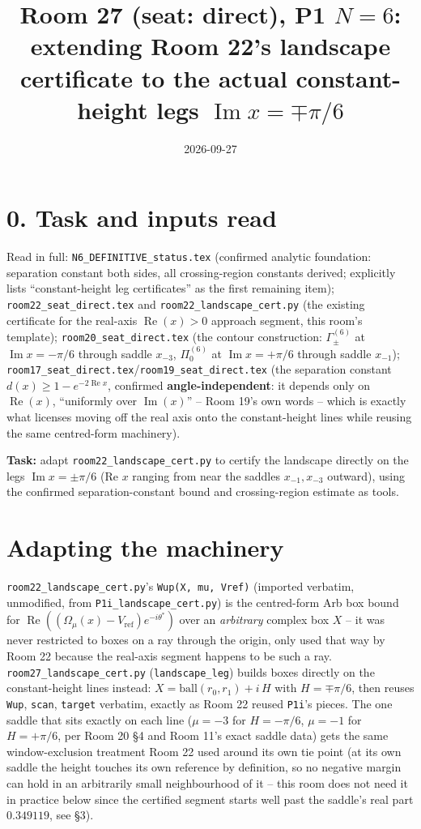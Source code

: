 \documentclass[11pt]{article}
\title{Room 27 (seat: direct), P1 $N=6$: extending Room 22's landscape certificate to the actual
constant-height legs $\operatorname{Im}x=\mp\pi/6$}
\date{2026-09-27}
\begin{document}
\maketitle

\section*{0. Task and inputs read}
Read in full: \texttt{N6\_DEFINITIVE\_status.tex} (confirmed analytic foundation: separation constant
both sides, all crossing-region constants derived; explicitly lists ``constant-height leg certificates''
as the first remaining item); \texttt{room22\_seat\_direct.tex} and \texttt{room22\_landscape\_cert.py}
(the existing certificate for the real-axis $\operatorname{Re}(x)>0$ approach segment, this room's
template); \texttt{room20\_seat\_direct.tex} (the contour construction: $\Gamma_\pm^{(6)}$ at
$\operatorname{Im}x=-\pi/6$ through saddle $x_{-3}$, $\Pi_0^{(6)}$ at $\operatorname{Im}x=+\pi/6$ through
saddle $x_{-1}$); \texttt{room17\_seat\_direct.tex}/\texttt{room19\_seat\_direct.tex} (the separation
constant $d(x)\ge1-e^{-2\operatorname{Re}x}$, confirmed \textbf{angle-independent}: it depends only on
$\operatorname{Re}(x)$, ``uniformly over $\operatorname{Im}(x)$'' -- Room 19's own words -- which is
exactly what licenses moving off the real axis onto the constant-height lines while reusing the same
centred-form machinery).

\textbf{Task:} adapt \texttt{room22\_landscape\_cert.py} to certify the landscape directly on the legs
$\operatorname{Im}x=\pm\pi/6$ (Re $x$ ranging from near the saddles $x_{-1},x_{-3}$ outward), using the
confirmed separation-constant bound and crossing-region estimate as tools.

\section{Adapting the machinery}
\texttt{room22\_landscape\_cert.py}'s \texttt{Wup(X, mu, Vref)} (imported verbatim, unmodified, from
\texttt{P1i\_landscape\_cert.py}) is the centred-form Arb box bound for
$\operatorname{Re}((\Omega_\mu(x)-V_{\mathrm{ref}})e^{-i\theta^\ast})$ over an \emph{arbitrary} complex box
$X$ -- it was never restricted to boxes on a ray through the origin, only used that way by Room 22 because
the real-axis segment happens to be such a ray. \texttt{room27\_landscape\_cert.py}
(\texttt{landscape\_leg}) builds boxes directly on the constant-height lines instead: $X=\mathrm{ball}(r_0,
r_1) + i\,H$ with $H=\mp\pi/6$, then reuses \texttt{Wup}, \texttt{scan}, \texttt{target} verbatim, exactly
as Room 22 reused \texttt{P1i}'s pieces. The one saddle that sits exactly on each line ($\mu=-3$ for
$H=-\pi/6$, $\mu=-1$ for $H=+\pi/6$, per Room 20 \S4 and Room 11's exact saddle data) gets the same
window-exclusion treatment Room 22 used around its own tie point (at its own saddle the height touches its
own reference by definition, so no negative margin can hold in an arbitrarily small neighbourhood of it --
this room does not need it in practice below since the certified segment starts well past the saddle's
real part $0.349119$, see \S3).
\end{document}
